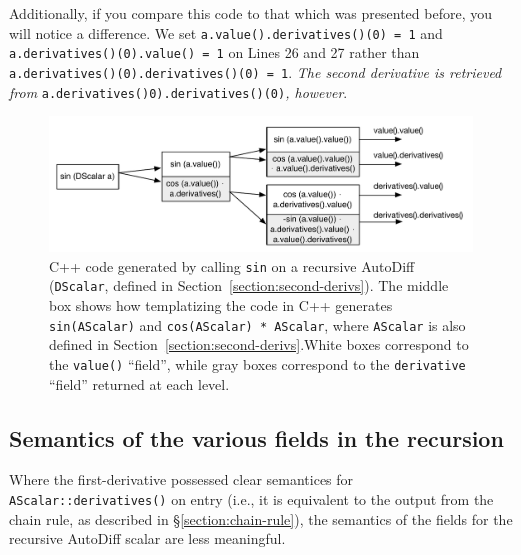 \documentclass[letterpaper, 12 pt, onecolumn, journal]{IEEEtran}  %
\begin{document}
Additionally, if you compare this code to that which was presented before, you will notice a difference. We set \texttt{a.value().derivatives()(0) = 1} and \texttt{a.derivatives()(0).value() = 1} on Lines 26 and 27 rather than \mbox{\texttt{a.derivatives()(0).derivatives()(0) = 1}}. \emph{The second derivative is retrieved from} \texttt{a.derivatives()0).derivatives()(0)}\emph{, however}. 

\begin{figure}[htp]
 \centering
\includegraphics[width=\linewidth]{second-deriv}
\caption{C++ code generated by calling \texttt{sin} on a recursive AutoDiff (\texttt{DScalar}, defined in Section~\ref{section:second-derivs}). The middle box shows how templatizing the code in C++ generates \texttt{sin(AScalar)} and \texttt{cos(AScalar) * AScalar}, where \texttt{AScalar} is also defined in Section~\ref{section:second-derivs}.White boxes correspond to the \texttt{value()} ``field'', while gray boxes correspond to the \texttt{derivative} ``field'' returned at each level. \label{fig:second-derivs}}
\end{figure}


\subsection*{Semantics of the various fields in the recursion}

Where the first-derivative possessed clear semantices for \texttt{AScalar::derivatives()} on entry (i.e., it is equivalent to the output from the chain rule, as described in \S\ref{section:chain-rule}), the semantics of the fields for the recursive AutoDiff scalar are less meaningful.\\ \vspace{5mm}
\end{document}
